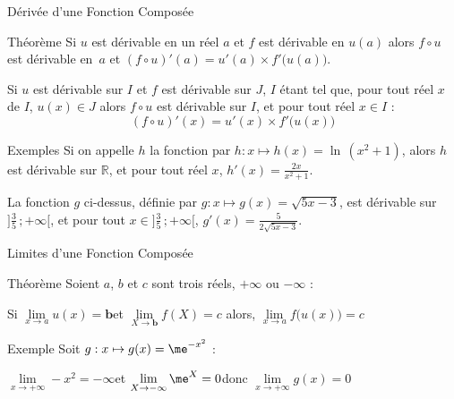 \documentclass{cours}
\begin{document}
    \begin{Gpartie}{Dérivée d'une Fonction Composée} 
        \begin{Spartie}{Théorème} 
            Si $u$ est dérivable en un réel $a$ et $f$ est dérivable en $u(a)$ alors $f\circ u$ est dérivable en~$a$ et $(f\circ u)'(a)=u'(a)\times f'\big(u(a)\big)$.

            Si $u$ est dérivable sur $I$ et $f$ est dérivable sur $J$, $I$ étant tel que, pour tout réel $x$ de $I$, $u(x)\in J$ alors $f\circ u$ est dérivable sur $I$, et pour tout réel $x\in I$ : \[\boxed{(f\circ u)'(x)=u'(x)\times f'\big(u(x)\big)}\] 
        \end{Spartie}
        \begin{Spartie}{Exemples} 
            Si on appelle $h$ la fonction par $h:x\mapsto h(x)=\ln\,(x^2+1)$, alors $h$ est dérivable sur $\mathbb{R}$, et pour tout réel $x$, $h'(x)=\frac{2x}{x^2+1}$.

            La fonction $g$ ci-dessus, définie par $g:x\mapsto g(x)=\sqrt{5x-3}$, est dérivable sur~$\Big]\frac{3}{5}\,;+\infty\Big[$, et pour tout $x\in\Big]\frac{3}{5}\,;+\infty\Big[$, $g'(x)=\frac{5}{2\sqrt{5x-3}}$.
        \end{Spartie}
    \end{Gpartie}
    \begin{Gpartie}{Limites d'une Fonction Composée} 
        \begin{Spartie}{Théorème} 
            Soient $a$, $b$ et $c$ sont trois réels, $+\infty$ ou $-\infty$ :

            Si \qquad$\lim\limits_{x\to a}u(x)=\boxed{\boldsymbol{b}}$\qquad et \qquad $\lim\limits_{X\to \boxed{\boldsymbol{b}}}f(X)=c$ \qquad alors, \qquad $\boxed{\lim\limits_{x\to a}f\big(u(x)\big)=c}$
        \end{Spartie}
        \begin{Spartie}{Exemple} 
            Soit $g:x\mapsto g(x)=\me^{-x^2}$ :

            $\lim\limits_{x\to +\infty} -x^2=-\infty$\qquad et \qquad$\lim\limits_{X\to -\infty} \me^X=0$\qquad donc \qquad$\lim\limits_{x\to +\infty}g(x)=0$
        \end{Spartie}
    \end{Gpartie}
\end{document}
